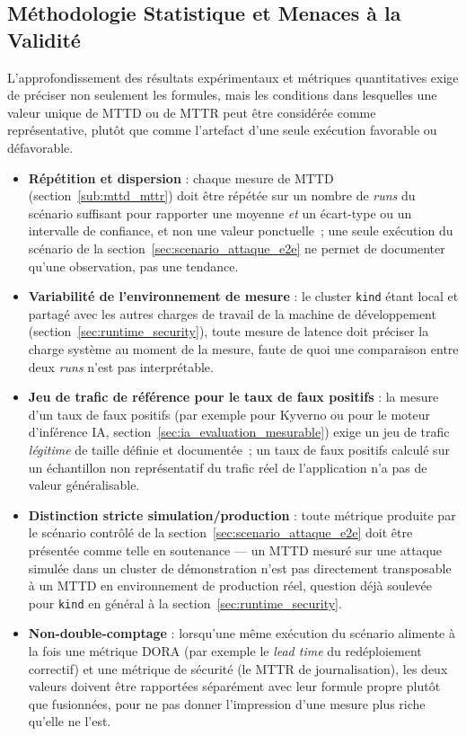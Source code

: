 \subsection{Méthodologie Statistique et Menaces à la Validité}
\label{sub:methodo_statistique}

L'approfondissement des résultats expérimentaux et métriques quantitatives exige de préciser non seulement les formules, mais les conditions dans lesquelles une valeur unique de MTTD ou de MTTR peut être considérée comme représentative, plutôt que comme l'artefact d'une seule exécution favorable ou défavorable.

\begin{itemize}
    \item \textbf{Répétition et dispersion} : chaque mesure de MTTD (section~\ref{sub:mttd_mttr}) doit être répétée sur un nombre de \textit{runs} du scénario suffisant pour rapporter une moyenne \emph{et} un écart-type ou un intervalle de confiance, et non une valeur ponctuelle~; une seule exécution du scénario de la section~\ref{sec:scenario_attaque_e2e} ne permet de documenter qu'une observation, pas une tendance.
    \item \textbf{Variabilité de l'environnement de mesure} : le cluster \texttt{kind} étant local et partagé avec les autres charges de travail de la machine de développement (section~\ref{sec:runtime_security}), toute mesure de latence doit préciser la charge système au moment de la mesure, faute de quoi une comparaison entre deux \textit{runs} n'est pas interprétable.
    \item \textbf{Jeu de trafic de référence pour le taux de faux positifs} : la mesure d'un taux de faux positifs (par exemple pour Kyverno ou pour le moteur d'inférence IA, section~\ref{sec:ia_evaluation_mesurable}) exige un jeu de trafic \emph{légitime} de taille définie et documentée~; un taux de faux positifs calculé sur un échantillon non représentatif du trafic réel de l'application n'a pas de valeur généralisable.
    \item \textbf{Distinction stricte simulation/production} : toute métrique produite par le scénario contrôlé de la section~\ref{sec:scenario_attaque_e2e} doit être présentée comme telle en soutenance — un MTTD mesuré sur une attaque simulée dans un cluster de démonstration n'est pas directement transposable à un MTTD en environnement de production réel, question déjà soulevée pour \texttt{kind} en général à la section~\ref{sec:runtime_security}.
    \item \textbf{Non-double-comptage} : lorsqu'une même exécution du scénario alimente à la fois une métrique DORA (par exemple le \textit{lead time} du redéploiement correctif) et une métrique de sécurité (le MTTR de journalisation), les deux valeurs doivent être rapportées séparément avec leur formule propre plutôt que fusionnées, pour ne pas donner l'impression d'une mesure plus riche qu'elle ne l'est.
\end{itemize}

